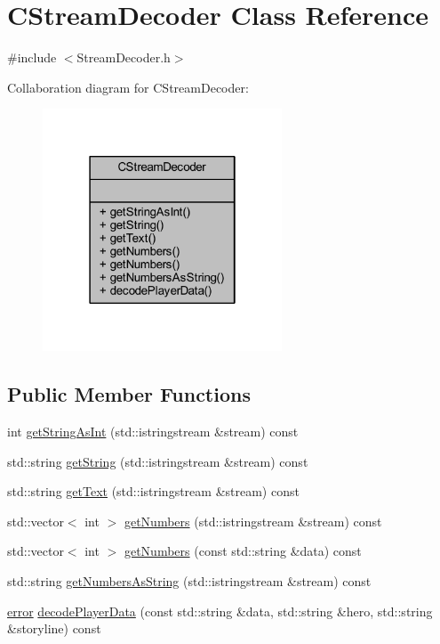 \hypertarget{class_c_stream_decoder}{}\section{C\+Stream\+Decoder Class Reference}
\label{class_c_stream_decoder}


{\ttfamily \#include $<$Stream\+Decoder.\+h$>$}



Collaboration diagram for C\+Stream\+Decoder\+:\nopagebreak
\begin{figure}[H]
\begin{center}
\leavevmode
\includegraphics[width=202pt]{class_c_stream_decoder__coll__graph}
\end{center}
\end{figure}
\subsection*{Public Member Functions}
\begin{DoxyCompactItemize}
\item 
int \mbox{\hyperlink{class_c_stream_decoder_aeaef1aa3239cf7b5d00397b6e46f67d1}{get\+String\+As\+Int}} (std\+::istringstream \&stream) const
\item 
std\+::string \mbox{\hyperlink{class_c_stream_decoder_a736a4660fb1fc91ffc7345050f815994}{get\+String}} (std\+::istringstream \&stream) const
\item 
std\+::string \mbox{\hyperlink{class_c_stream_decoder_a4ddd62e9d414ff656f5708e3c0c39b36}{get\+Text}} (std\+::istringstream \&stream) const
\item 
std\+::vector$<$ int $>$ \mbox{\hyperlink{class_c_stream_decoder_a57a7f304974a6b5be31e374685b70e33}{get\+Numbers}} (std\+::istringstream \&stream) const
\item 
std\+::vector$<$ int $>$ \mbox{\hyperlink{class_c_stream_decoder_a848bbd5eb77abad9007b94cf631b0761}{get\+Numbers}} (const std\+::string \&data) const
\item 
std\+::string \mbox{\hyperlink{class_c_stream_decoder_a5df71ab29ca4dc60f6c628fcb4a77949}{get\+Numbers\+As\+String}} (std\+::istringstream \&stream) const
\item 
\mbox{\hyperlink{_errors_list_8h_af10dacfa214e2575bb2e0ee407c242e0}{error}} \mbox{\hyperlink{class_c_stream_decoder_a27f04fbbe2eb121fe15988594fe7053f}{decode\+Player\+Data}} (const std\+::string \&data, std\+::string \&hero, std\+::string \&storyline) const
\end{DoxyCompactItemize}


